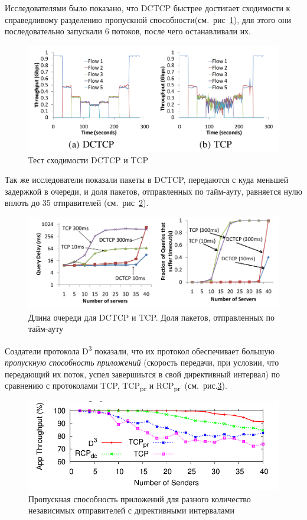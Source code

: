 \documentclass[14pt, a4paper,oneside]{extarticle}
\begin{document}
Исследователями было показано, что DCTCP быстрее достигает сходимости к справедливому разделению пропускной способности(см.~рис~\ref{fair_share}), для этого они последовательно запускали 6 потоков, после чего останавливали их.
\begin{figure}
	\includegraphics[width=\linewidth]{fair_share}
	\caption{Тест сходимости DCTCP и TCP}
	\label{fair_share}
\end{figure}

Так же исследователи показали пакеты в DCTCP, передаются с куда меньшей задержкой в очереди, и доля пакетов, отправленных по тайм-ауту, равняется нулю вплоть до 35 отправителей (см.~рис~\ref{delays}).

\begin{figure}
	\includegraphics[width=\linewidth]{delays1}
	\caption{Длина очереди для DCTCP и TCP. Доля пакетов, отправленных по тайм-ауту}
	\label{delays}
\end{figure}

Создатели протокола D\textsuperscript{3} показали, что их протокол обеспечивает большую \emph{пропускную способность приложений} (скорость передачи, при условии, что передающий их поток, успел завершиьтся в свой директивный интервал) по сравнению с протоколами TCP, TCP\textsubscript{pr} и RCP\textsubscript{pr}~(см.~рис.\ref{d3_throughput}).  
\begin{figure}
	\includegraphics[width=\linewidth]{d3_throughput}
	\caption{Пропускная способность приложений для разного количество независимых отправителей с директивными интервалами}
	\label{d3_throughput}
\end{figure}
\end{document}
